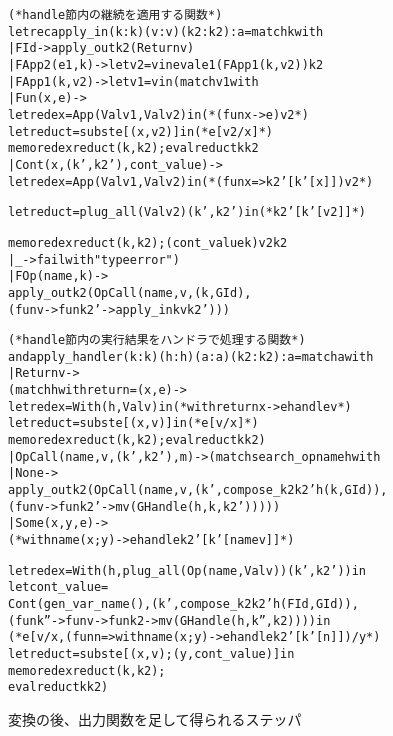 \begin{figure}
\begin{spacing}{0.9}
\begin{alltt}
(* handle 節内の継続を適用する関数 *)
let rec apply_in (k : k) (v : v) (k2 : k2) : a = match k with
  | FId -> apply_out k2 (Return v)
  | FApp2 (e1, k) -> let v2 = v in eval e1 (FApp1 (k, v2)) k2
  | FApp1 (k, v2) -> let v1 = v in (match v1 with
    | Fun (x, e) ->
       \colorbox{lg}{let redex = App (Val v1, Val v2) in  (* (fun x -> e) v2 *)}
       let reduct = subst e [(x, v2)] in    \colorbox{lg}{(* e[v2/x] *)}
       \colorbox{lg}{memo redex reduct (k, k2);} eval reduct k k2
    | Cont (x, \colorbox{lg}{(k', k2'),} cont_value) ->
       \colorbox{lg}{let redex = App (Val v1, Val v2) in  (* (fun x => k2'[k'[x]]) v2 *)}
\end{alltt}
\vspace{-26pt}
\begin{alltt}
       \colorbox{lg}{let reduct = plug_all (Val v2) (k', k2') in  (* k2'[k'[v2]] *)}
\end{alltt}
\vspace{-26pt}
\begin{alltt}
       \colorbox{lg}{memo redex reduct (k, k2);} (cont_value k) v2 k2
    | _ -> failwith "type error")
  | FOp (name, k) ->
    apply_out k2 (OpCall (name, v, (k, GId),
      (fun v -> fun k2' -> apply_in k v k2')))

(* handle 節内の実行結果をハンドラで処理する関数 *)
and apply_handler (k : k) (h : h) (a : a) (k2 : k2) : a = match a with
  | Return v ->
    (match h with \LBR{}return = (x, e)\RBR ->
      \colorbox{lg}{let redex = With (h, Val v) in  (* with \LBR{}return x -> e\RBR handle v *)}
      let reduct = subst e [(x, v)] in  \colorbox{lg}{(* e[v/x] *)}
      \colorbox{lg}{memo redex reduct (k, k2);} eval reduct k k2)
  | OpCall (name, v, \colorbox{lg}{(k', k2'),} m) -> (match search_op name h with
    | None ->
      apply_out k2 (OpCall (name, v, \colorbox{lg}{(k', compose_k2 k2' h (k, GId)),}
        (fun v -> fun k2' -> m v (GHandle (h, k, k2')))))
    | Some (x, y, e) ->
      \colorbox{lg}{(* with \LBR{}name(x; y) -> e\RBR handle k2'[k'[name v]] *)}
\end{alltt}
\vspace{-26pt}
\begin{alltt}
      \colorbox{lg}{let redex = With (h, plug_all (Op (name, Val v)) (k', k2')) in}
      let cont_value =
        Cont (\colorbox{lg}{gen_var_name (),} (k', compose_k2 k2' h (FId, GId)),
          (fun k'' -> fun v -> fun k2 -> m v (GHandle (h, k'', k2)))) in
      \colorbox{lg}{(* e[v/x, (fun n => with \LBR{}name(x; y) -> e\RBR handle k2'[k'[n]]) /y *)}
      let reduct = subst e [(x, v); (y, cont_value)] in
      \colorbox{lg}{memo redex reduct (k, k2);}
      eval reduct k k2)
\end{alltt}
\caption{変換の後、出力関数を足して得られるステッパ}
\label{figure:5memo}
\end{spacing}
\end{figure}

